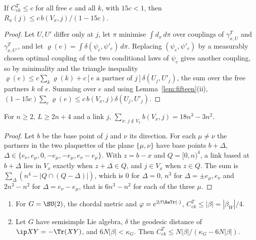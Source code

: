 \begin{lemma}\label{lem:bpblock}
If $C^T_{ek}\le c$ for all free $e$ and all $k$, with $15c<1$, then
$R_x(j)\le c\,b(V_x,j)/(1-15c)$.
\end{lemma}

\begin{proof}
Let $U,U'$ differ only at $j$, let $\pi$ minimise $\int d_x\,d\pi$ over
couplings of $\gamma^T_{x,U}$ and $\gamma^T_{x,U'}$, and let $\varrho(e)=\int
\delta(\psi_e,\psi'_e)\,d\pi$. Replacing $(\psi_e,\psi'_e)$ by a measurably
chosen optimal coupling of the two conditional laws of $\psi_e$
\cite[Cor.~5.22]{Vil09} gives another coupling, so by minimality and the
triangle inequality $\varrho(e)\le c\sum_k\varrho(k)+c[e\text{ a partner of }j]
\delta(U_j,U'_j)$, the sum over the free partners $k$ of $e$. Summing over $e$
and using Lemma~\ref{lem:fifteen}(ii), $(1-15c)\sum_e\varrho(e)\le
c\,b(V_x,j)\delta(U_j,U'_j)$.
\end{proof}

\begin{lemma}\label{lem:bpcount}
For $n\ge2$, $L\ge2n+4$ and a link $j$, $\sum_{x:\,j\notin V_x}b(V_x,j)=
18n^3-3n^2$.
\end{lemma}

\begin{proof}
Let $b$ be the base point of $j$ and $\nu$ its direction. For each $\mu\ne\nu$
the partners in the two plaquettes of the plane $\{\mu,\nu\}$ have base points
$b+\Delta$, $\Delta\in\{e_\nu,e_\mu,0,-e_\mu,-e_\mu,e_\nu-e_\mu\}$. With $z=b-x$
and $Q=[0,n)^4$, a link based at $b+\Delta$ lies in $V_x$ exactly when $z+\Delta\in
Q$, and $j\in V_x$ when $z\in Q$. The sum is $\sum_\Delta(n^4-|Q\cap(Q-\Delta)|)$,
which is $0$ for $\Delta=0$, $n^3$ for $\Delta=\pm e_\mu,e_\nu$ and $2n^3-n^2$ for
$\Delta=e_\nu-e_\mu$, that is $6n^3-n^2$ for each of the three $\mu$.
\end{proof}

\begin{lemma}\label{lem:onelink}
\begin{enumerate}[label=\textup{(\roman*)},leftmargin=*]
\item For $G=\SU(2)$, the chordal metric and $\varphi=e^{2\beta\ReTr(\cdot)}$,
$C^T_{ek}\le|\beta|=|\beta_W|/4$.
\item Let $G$ have semisimple Lie algebra, $\delta$ the geodesic distance of
$\ip XY=-\Tr(XY)$, and $6N|\beta|<\kappa_G$. Then $C^T_{ek}\le N|\beta|/
(\kappa_G-6N|\beta|)$.
\end{enumerate}
\end{lemma}

